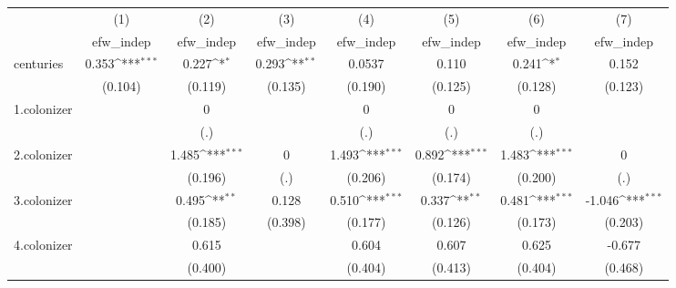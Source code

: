 {
\def\sym#1{\ifmmode^{#1}\else\(^{#1}\)\fi}
\begin{tabular}{l*{7}{c}}
\hline\hline
            &\multicolumn{1}{c}{(1)}&\multicolumn{1}{c}{(2)}&\multicolumn{1}{c}{(3)}&\multicolumn{1}{c}{(4)}&\multicolumn{1}{c}{(5)}&\multicolumn{1}{c}{(6)}&\multicolumn{1}{c}{(7)}\\
            &\multicolumn{1}{c}{efw\_indep}&\multicolumn{1}{c}{efw\_indep}&\multicolumn{1}{c}{efw\_indep}&\multicolumn{1}{c}{efw\_indep}&\multicolumn{1}{c}{efw\_indep}&\multicolumn{1}{c}{efw\_indep}&\multicolumn{1}{c}{efw\_indep}\\
\hline
centuries   &       0.353\sym{***}&       0.227\sym{*}  &       0.293\sym{**} &      0.0537         &       0.110         &       0.241\sym{*}  &       0.152         \\
            &     (0.104)         &     (0.119)         &     (0.135)         &     (0.190)         &     (0.125)         &     (0.128)         &     (0.123)         \\
[1em]
1.colonizer &                     &           0         &                     &           0         &           0         &           0         &                     \\
            &                     &         (.)         &                     &         (.)         &         (.)         &         (.)         &                     \\
[1em]
2.colonizer &                     &       1.485\sym{***}&           0         &       1.493\sym{***}&       0.892\sym{***}&       1.483\sym{***}&           0         \\
            &                     &     (0.196)         &         (.)         &     (0.206)         &     (0.174)         &     (0.200)         &         (.)         \\
[1em]
3.colonizer &                     &       0.495\sym{**} &       0.128         &       0.510\sym{***}&       0.337\sym{**} &       0.481\sym{***}&      -1.046\sym{***}\\
            &                     &     (0.185)         &     (0.398)         &     (0.177)         &     (0.126)         &     (0.173)         &     (0.203)         \\
[1em]
4.colonizer &                     &       0.615         &                     &       0.604         &       0.607         &       0.625         &      -0.677         \\
            &                     &     (0.400)         &                     &     (0.404)         &     (0.413)         &     (0.404)         &     (0.468)         \\

\end{tabular}}
